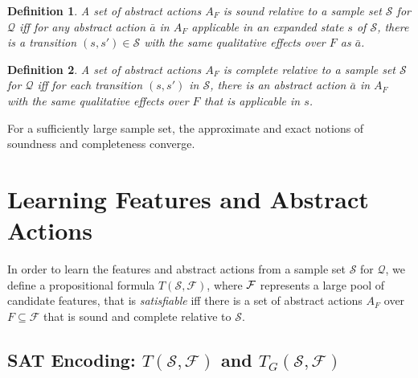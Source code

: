 \documentclass[letterpaper]{article} %
\newtheorem{definition}{Definition}
\newcommand{\Q}{\mathcal{Q}}
\newcommand{\F}{\mathcal{F}}
\renewcommand{\S}{\mathcal{S}}
\begin{document}
\begin{definition}
  A set of abstract actions $A_F$ is sound \emph{relative to a  sample set} $\S$ for $\Q$
  iff for  any  abstract action $\bar{a}$ in $A_F$ applicable in an expanded state $s$ of $\S$,
  there is a transition $(s,s') \in \S$ with the same qualitative  effects over $F$ as $\bar{a}$.
\end{definition}

\begin{definition}
  A set of abstract actions $A_F$ is complete   \emph{relative to a sample set} $\S$ for $\Q$
  iff for each transition  $(s,s')$ in  $\S$, there is an abstract action $\bar{a}$ in $A_F$
  with the same qualitative effects over $F$ that is applicable in $s$.
\end{definition}

For a sufficiently large sample set, the approximate and exact notions of soundness and completeness   converge.


\section{Learning Features and Abstract Actions}

In order to learn the features and abstract actions from a sample set $\S$ for $\Q$, 
we define a propositional formula $T(\S,\F)$, where  $\cal F$ represents a large
pool of candidate features, that is \emph{satisfiable} iff there is
a set of abstract actions $A_F$ over  $F \subseteq \F$ that is sound and complete
relative to $\S$. 

\subsection{SAT Encoding: $T(\S,\F)$ and $T_G(\S,\F)$}
\end{document}
